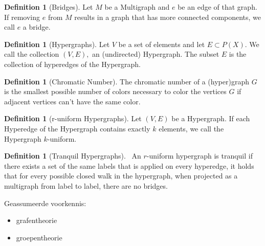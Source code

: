 \documentclass[a4paper,10pt]{article}
\theoremstyle{plain}
\theoremstyle{definition}
\newtheorem{definition}[theorem]{Definition}
\theoremstyle{remark}
\begin{document}
    \begin{definition}[Bridges]\label{bridge}
        Let \(M\) be a Multigraph and \(e\) be an edge of that graph. If removing \(e\) from \(M\) results in a graph that has more connected components, we call \(e\) a bridge.
    \end{definition}

    \begin{definition}[Hypergraphs]\label{hypergraph}
        Let \(V\) be a set of elements and let \(E\subset P(X)\). We call the collection
        \((V,E),\) an (undirected) Hypergraph. The subset \(E\) is the collection of hyperedges of the Hypergraph.
    \end{definition}

    \begin{definition}[Chromatic Number]\label{def:chromatic}
        The chromatic number of a (hyper)graph \(G\) is the smallest possible number of colors necessary to color the vertices \(G\) if adjacent vertices can't have the same color.
    \end{definition}

    \begin{definition}[r-uniform Hypergraphs]\label{def:r-uniform}
        Let \((V, E)\) be a Hypergraph. If each Hyperedge of the Hypergraph contains exactly \(k\) elements, we call the Hypergraph \(k\)-uniform.
    \end{definition}
    
    \begin{definition}[Tranquil Hypergraphs]\label{def:tranquil}
        ~An \(r\)-uniform hypergraph is tranquil if there exists a set of the same labels that is applied on every hyperedge, it holds that for every possible closed walk in the hypergraph, when projected as a multigraph from label to label, there are no bridges.
    \end{definition}
    
    Geassumeerde voorkennis:
     \begin{itemize}
         \item grafentheorie
         \item groepentheorie
     \end{itemize}
    
\end{document}
